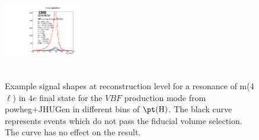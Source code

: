 \begin{figure}[htb]
\begin{center}
{      \includegraphics[width=0.3\textwidth,angle=0]{Figures/Appendix//VBF_powheg_JHUgen_125_4e_pT4l_genbin4_recobin4_effs_genWeight*pileupWeight*dataMCWeight.pdf}
      \label{fig:sigfits-pT4l-VBF-powheg15-JHUgen-125-maintext:e}
    }
     \\
    \\
    \caption{ Example signal shapes at reconstruction level for a resonance of m(4$\ell$) in $4e$ final state for the $VBF$ production mode from {\sc powheg+JHUGen} in different bins of $\pt(\mathrm{H})$. The black curve represents events which do not pass the fiducial volume selection. The curve has no effect on the result.
    }
  \label{fig:sigfits-pT4l-VBF-powheg15-JHUgen-125-maintext}
 \end{center}
\end{figure} \clearpage


